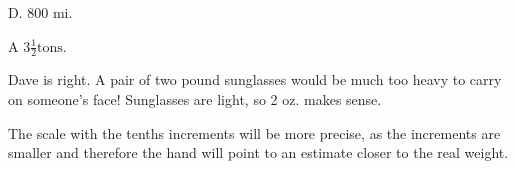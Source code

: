 \documentclass[12pt]{article}
\newenvironment{problem}[2][Problem]{\begin{trivlist}
\item[\hskip \labelsep {\bfseries #1}\hskip \labelsep {\bfseries #2.}]}{\end{trivlist}}
\begin{document}
\begin{problem}{27}
D. 800 mi.
\end{problem}

\begin{problem}{28}
A $3 \frac{1}{2} \text{tons.}$
\end{problem}

\begin{problem}{29}
Dave is right. A pair of two pound sunglasses would be much too heavy to carry on someone's face! Sunglasses are light, so 2 oz. makes sense.
\end{problem}

\begin{problem}{30}
The scale with the tenths increments will be more precise, as the increments are smaller and therefore the hand will point to an estimate closer to the real weight. 
\end{problem}
\end{document}
